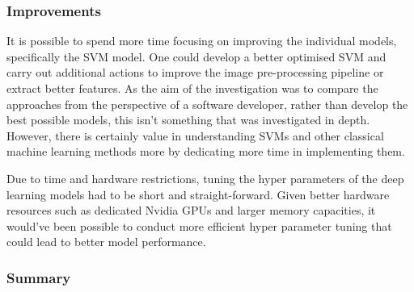 \documentclass{article}
\begin{document}
\subsubsection*{Improvements}

It is possible to spend more time focusing on improving the individual models, specifically the SVM model. One could 
develop a better optimised SVM and carry out additional actions to improve the image pre-processing pipeline or extract 
better features. As the aim of the investigation was to compare the approaches from the perspective of a software 
developer, rather than develop the best possible models, this isn't something that was investigated in depth. However, 
there is certainly value in understanding SVMs and other classical machine learning methods more by dedicating more time
in implementing them.

\par

Due to time and hardware restrictions, tuning the hyper parameters of the deep learning models had to be short and 
straight-forward. Given better hardware resources such as dedicated Nvidia GPUs and larger memory capacities, 
it would've been possible to conduct more efficient hyper parameter tuning that could lead to better model performance.

\subsubsection*{Summary}
\end{document}
